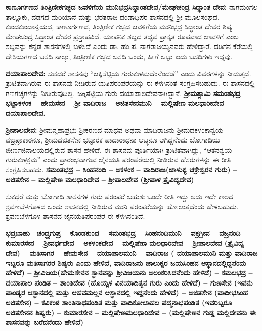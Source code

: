 \textbf{ಕಾಣೂರ್ಗಣದ ತಿಂತ್ರಿಣೀಕಗಚ್ಛದ ಜವಳಿಗೆಯ ಮುನಿಭದ್ರಸಿದ್ಧಾಂತದೇವ/ಮೇಘಚಂದ್ರ ಸಿದ್ಧಾಂತ ದೇವ:} ನಾಗಮಂಗಲ ತಾಲ್ಲೂಕು, ದಡಗದ ಮರಿಯಾನೆ ಮತ್ತು ಭರತರಾಜ ದಂಡಾಧಿಪರ ಶಾಸನದಲ್ಲಿ ಶ‍್ರೀ ಮೂಲಸಂಘದ, ಕುಂದಕುಂದಾನ್ವಯದ, ಕಾಣೂರ್ಗಣದ, ತಿಂತ್ರಿಣೀಕ ಗಚ್ಛದ ಜವಳಿಗೆಯ ಮುನಿಭದ್ರ ಸಿದ್ಧಾಂತ ದೇವರ ಶಿಷ್ಯ ಮೇಘಚಂದ್ರ ಸಿದ್ಧಾಂತ ದೇವರ ಪ್ರಸ್ತಾಪವಿದೆ. ಯಾಪನಿಕ ಶಬ್ದದ ತದ್ಭವ ಪ್ರಾಕೃತ ರೂಪವಾದ ಜಾವಳಿಗೆ ಎಂಬ ಶಬ್ದವನ್ನು ಕನ್ನಡ ಶಾಸನಗಳಲ್ಲಿ ಬಳಸಿದೆ ಎಂದು ಡಾ. ಹಂ.ಪ. ನಾಗರಾಜಯ್ಯನವರು ಹೇಳಿದ್ದಾರೆ. ದಡಿಗನ ಕೆರೆಯಲ್ಲಿ ದೇಸಿಯಗಣದ ಬಸದಿ ನಾಲ್ಕು, ತಿಂತ್ರೀಣಿಕ ಗಚ್ಛದ ಬಸದಿ ಒಂದು, ಹೀಗೆ ಒಟ್ಟು ಐದು ಬಸದಿಗಳು ಇದ್ದವು. 

\textbf{ದಯಾಪಾಲದೇವ:} ಸುಕದರೆ ಶಾಸನವು “ಜಕ್ಕಿಸೆಟ್ಟಿಯ ಗುರುಕುಳಮದೆಂನ್ತೆಂದಡೆ” ಎಂದು ವಿವರಗಳನ್ನು ನೀಡುತ್ತದೆ. ತ್ರುಟಿತವಾಗಿರುವ ಈ ಶಾಸನವು ನೀಡಿರುವ ಯತಿಪರಂಪರೆಯನ್ನು ಈ ಕೆಳಗಿನಂತೆ ಸಂಗ್ರಹಿಸಬಹುದು. ಈ ಶಾಸನದಲ್ಲಿ ಗಣಗಚ್ಛಗಳನ್ನು ನೀಡಿರುವುದಿಲ್ಲ. ಜಕ್ಕಿಸೆಟ್ಟಿಯ ಗುರು ದಯಾಪಾಲದೇವನಾಗಿದ್ದಾನೆ. \textbf{ಶ‍್ರೀಮತ್ಸಾಮಿ ಸಮಂತಭದ್ರ – ಭಟ್ಟಾಕಳಂಕ – ಹೇಮಸೇನ – ಶ‍್ರೀ ವಾದಿರಾಜ – ಅಜಿತಸೇನಮುನಿ – ಮಲ್ಲಿಷೇಣ ಮಲಧಾರೀದೇವ – ದಯಾಪಾಲದೇವ. }

\textbf{ಶ‍್ರೀಪಾಲದೇವ:} ಶ‍್ರೀಮನ್ಮಹಾಪ್ರಭು ಶ‍್ರೀಕರಣದ ಮಾಧವ ಅಥವಾ ಮಾದಿರಾಜನು ಶ‍್ರೀಮದಕಳಂಕಾನ್ವಯ ವಜ್ರಪ್ರಾಕಾರನೂ, ಶ‍್ರೀಮದಜಿತಸೇನ ಭಟ್ಟಾರಕ ಪಾದಾರಾಧನಾ ಲಬ್ಧನೂ ಆಗಿದ್ದನೆಂದು ಬೋಗಾದಿಯ ಜೀರ್ಣಜಿನಾಲಯದಲ್ಲಿರುವ ಶಾಸನ ಹೇಳಿದೆ. ಈ ಶಾಸನವು ಪೂರ್ತಿಯಾಗಿ ತ್ರುಟಿತವಾಗಿದ್ದು, “ಆತನನ್ವಯ ಗುರುಕುಳಕ್ರಮ” ಎಂದು ಪ್ರಾರಂಭವಾಗುವ ಜೈನಯತಿ ಪರಂಪರೆಯಲ್ಲಿ ನೀಡಿರುವ ಹೆಸರುಗಳನ್ನು ಈ ರೀತಿ ಸಂಗ್ರಹಿಸಬಹದು. \textbf{ಸಮಂತಭದ್ರ – ಸಿಂಹನಂದಿ – ಅಕಳಂಕ – ವಾದಿರಾಜ(ಚಾಳುಕ್ಯ ಚಕ್ರೇಶ್ವರನ ಗುರು) – ಅಜಿತಸೇನ – ಮಲ್ಲಿಷೇಣ ಮಲಧಾರಿದೇವ – ಶ‍್ರೀಪಾಲದೇವ (ಶ‍್ರೀಪಾಳ ತ್ರೈವಿದ್ಯದೇವ) }

ಸುಕಧರೆ ಮತ್ತು ಬೋಗಾದಿ ಶಾಸನಗಳ ಗುರು ಪರಂಪರೆ ಬಹುಶಃ ಒಂದೇ ರೀತಿ ಇದ್ದು ಅದು ಇದೇ ಕಾಲದ ಶ್ರವಣಬೆಳಗೊಳದ ಒಂದು ಶಾಸನದಲ್ಲಿ ನೀಡಿರುವ ಮುನಿ ಪರಂಪರೆಯನ್ನು ಹೋಲುತ್ತದೆಂದು ಹೇಳಬಹುದು. ಶ್ರವಣಬೆಳಗೊಳ ಶಾಸನದ ಜೈನಯತಿಪರಂಪರೆ ಈ ಕೆಳಗಿನಂತಿದೆ.

\textbf{ಭದ್ರಬಾಹು –ಚಂದ್ರ್ರಗುಪ್ರ – ಕೊಂಡಕುಂದ – ಸಮಂತಭದ್ರ – ಸಿಂಹನಂದಿಮುನಿ – ವಕ್ರಗ್ರೀವ – ವಜ್ರನಂದಿ – ಕುಮಾರಸೇನ – ಶ‍್ರೀವರ್ಧದೇವ – ಅಕಳಂಕದೇವ – ಮಲ್ಲಿಷೇಣ ಮಲಧಾರಿದೇವ – ಶ‍್ರೀಪಾಲದೇವ (ತ್ರೈವಿದ್ಯ ದೇವ) – ಮತಿಸಾಗರ – ಹೇಮಸೇನ – ದಯಾಪಾಲಮುನಿ – ವಾದಿರಾಜ ( ದಯಾಪಾಲಮುನಿ ಮತ್ತು ವಾದಿರಾಜ ಇಬ್ಬರೂ ಮತಿಸಾಗರರ ಶಿಷ್ಯರು ಎಂದು ಹೇಳಿದೆ, ವಾದಿರಾಜನು ಚಾಲುಕ್ಯರ ಜಯಸಿಂಹನ ಆಸ್ಥಾನದಲ್ಲಿದ್ದನೆಂದು ಹೇಳಿದೆ) – ಶ‍್ರೀವಿಜಯ(ಹೇಮಸೇನನ ಸ್ಥಾನವನ್ನು ಶ‍್ರೀವಿಜಯನು ಅಲಂಕರಿಸಿದನೆಂದು ಹೇಳಿದೆ) – ಕಮಲಭದ್ರ – ದಯಾಪಾಲ ಪಂಡಿತ – ಶಾಂತಿದೇವ (ಹೊಯ್ಸಳ ವಿನಯಾದಿತ್ಯನ ಗುರು ಎಂದು ಹೇಳಿದೆ) – ಗುಣಸೇನ (ಇವನು ಪಾಂಡ್ಯರ ಆಸ್ಥಾನದಲ್ಲಿ ಮತ್ತು ಆಹವಮಲ್ಲನ ಆಸ್ಥಾನದಲ್ಲಿ ಇದ್ದನೆಂದು ಹೇಳಿದೆ) – ಅಜಿತಸೇನ (ವಾದೀಭಸಿಂಹ ಅಜಿತಸೇನ) – ಕವಿಕಂಠ ಶಾಂತಿನಾಥಪಂಡಿತ ಮತ್ತು ವಾದಿಕೋಲಾಹಲ ಪದ್ಮನಾಭಪಂಡಿತ (ಇವರಿಬ್ಬರೂ ಅಜಿತಸೇನನ ಶಿಷ್ಯರು) – ಕುಮಾರಸೇನ – ಮಲ್ಲಿಷೇಣಮಲಧಾರಿದೇವ – (ಮಲ್ಲಿಷೇಣನ ಗುಡ್ಡ ಮಲ್ಲಿದೇವನು ಈ ಶಾಸನವನ್ನು ಬರೆದನೆಂದು ಹೇಳಿದೆ)}

